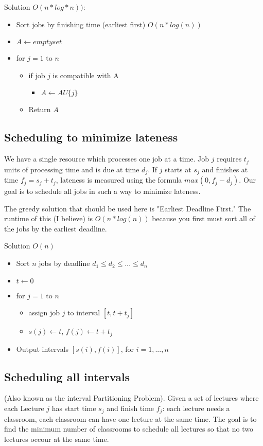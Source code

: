 \documentclass{article}
\begin{document}
Solution $O(n*log*n))$:
\begin{itemize}
    \item Sort jobs by finishing time (earliest first) $O(n*log(n))$
    \item $A \gets empty set$
    \item for $j = 1$ to $n$ \begin{itemize}
        \item if job $j$ is compatible with A \begin{itemize}
            \item $A \gets A U \{j\}$
        \end{itemize}
    \item Return $A$
    \end{itemize}
\end{itemize}

\subsection{Scheduling to minimize lateness}
We have a single resource which processes one job at a time. Job $j$ requires $t_j$ units of processing time and is due at time $d_j$. If $j$ starts at $s_j$ and finishes at time $f_j = s_j + t_j$, lateness is measured using the formula $max(0, f_j - d_j)$. Our goal is to schedule all jobs in such a way to minimize lateness.

The greedy solution that should be used here is "Earliest Deadline First." The runtime of this (I believe) is $O(n*log(n))$ because you first must sort all of the jobs by the earliest deadline.

Solution $O(n)$ \begin{itemize}
    \item Sort $n$ jobs by deadline $d_1 \leq d_2 \leq ... \leq d_n$
    \item $t \gets 0$
    \item for $j = 1$ to $n$ \begin{itemize}
        \item assign job $j$ to interval $[t, t+t_j]$
        \item $s(j) \gets t$, $f(j) \gets t + t_j$
    \end{itemize}
    \item Output intervals $[s(i), f(i)]$, for $i=1,...,n$
\end{itemize}

\subsection{Scheduling all intervals}
(Also known as the interval Partitioning Problem). Given a set of lectures where each Lecture $j$ has start time $s_j$ and finish time $f_j$: each lecture needs a classroom, each classroom can have one lecture at the same time. The goal is to find the minimum number of classrooms to schedule all lectures so that no two lectures occour at the same time. 
\end{document}
